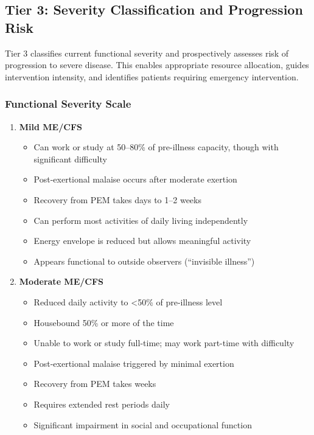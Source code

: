 \subsection{Tier 3: Severity Classification and Progression Risk}
\label{subsec:tier3}

Tier 3 classifies current functional severity and prospectively assesses risk of progression to severe disease. This enables appropriate resource allocation, guides intervention intensity, and identifies patients requiring emergency intervention.

\subsubsection{Functional Severity Scale}

\begin{enumerate}
    \item \textbf{Mild ME/CFS}
    \begin{itemize}
        \item Can work or study at 50--80\% of pre-illness capacity, though with significant difficulty
        \item Post-exertional malaise occurs after moderate exertion
        \item Recovery from PEM takes days to 1--2 weeks
        \item Can perform most activities of daily living independently
        \item Energy envelope is reduced but allows meaningful activity
        \item Appears functional to outside observers (``invisible illness'')
    \end{itemize}

    \item \textbf{Moderate ME/CFS}
    \begin{itemize}
        \item Reduced daily activity to <50\% of pre-illness level
        \item Housebound 50\% or more of the time
        \item Unable to work or study full-time; may work part-time with difficulty
        \item Post-exertional malaise triggered by minimal exertion
        \item Recovery from PEM takes weeks
        \item Requires extended rest periods daily
        \item Significant impairment in social and occupational function
    \end{itemize}


\end{enumerate}
